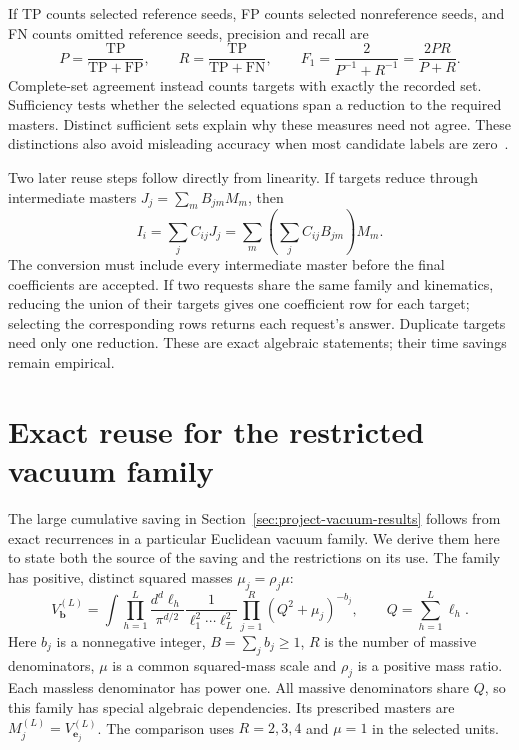 If TP counts selected reference seeds, FP counts selected nonreference seeds, and FN counts omitted reference seeds, precision and recall are
\begin{equation}
 P=\frac{\mathrm{TP}}{\mathrm{TP}+\mathrm{FP}},\qquad
 R=\frac{\mathrm{TP}}{\mathrm{TP}+\mathrm{FN}},\qquad
 F_1=\frac{2}{P^{-1}+R^{-1}}=\frac{2PR}{P+R}.
\end{equation}
Complete-set agreement instead counts targets with exactly the recorded set. Sufficiency tests whether the selected equations span a reduction to the required masters. Distinct sufficient sets explain why these measures need not agree. These distinctions also avoid misleading accuracy when most candidate labels are zero~\cite{SaitoRehmsmeier2015}.

Two later reuse steps follow directly from linearity. If targets reduce through intermediate masters $J_j=\sum_mB_{jm}M_m$, then
\begin{equation}
 I_i=\sum_j C_{ij}J_j
     =\sum_m\left(\sum_j C_{ij}B_{jm}\right)M_m.
\end{equation}
The conversion must include every intermediate master before the final coefficients are accepted. If two requests share the same family and kinematics, reducing the union of their targets gives one coefficient row for each target; selecting the corresponding rows returns each request's answer. Duplicate targets need only one reduction. These are exact algebraic statements; their time savings remain empirical.

\section{Exact reuse for the restricted vacuum family}
\label{app:project-vacuum}
The large cumulative saving in Section~\ref{sec:project-vacuum-results} follows from exact recurrences in a particular Euclidean vacuum family. We derive them here to state both the source of the saving and the restrictions on its use. The family has positive, distinct squared masses $\mu_j=\rho_j\mu$:
\begin{equation}
 V^{(L)}_{\boldsymbol b}=
 \int\prod_{h=1}^L\frac{d^d\ell_h}{\pi^{d/2}}
 \frac{1}{\ell_1^2\cdots\ell_L^2}
 \prod_{j=1}^{R}(Q^2+\mu_j)^{-b_j},
 \qquad Q=\sum_{h=1}^L\ell_h.
 \label{eq:vacuum}
\end{equation}
Here $b_j$ is a nonnegative integer, $B=\sum_jb_j\geq1$, $R$ is the number of massive denominators, $\mu$ is a common squared-mass scale and $\rho_j$ is a positive mass ratio. Each massless denominator has power one. All massive denominators share $Q$, so this family has special algebraic dependencies. Its prescribed masters are $M_j^{(L)}=V^{(L)}_{\boldsymbol e_j}$. The comparison uses $R=2,3,4$ and $\mu=1$ in the selected units.

